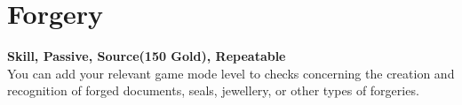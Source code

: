 \section{Forgery}\label{sec:forgery}
\textbf{Skill, Passive, Source(150 Gold), Repeatable}\\
You can add your relevant game mode level to checks concerning the creation and recognition of forged documents, seals, jewellery, or other types of forgeries.